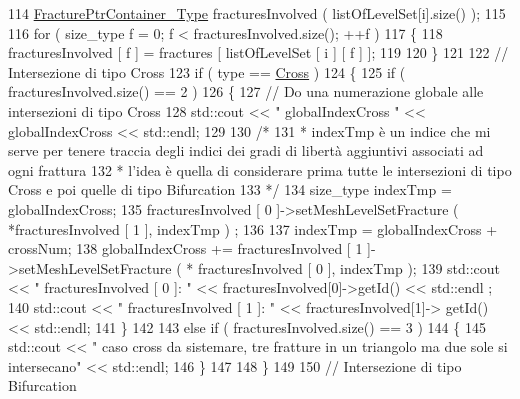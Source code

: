 \begin{DoxyCode}
114            \hyperlink{FractureHandler_8h_a2f0b57e18ecf89912d7de0c87158009e}{FracturePtrContainer\_Type} fracturesInvolved ( listOfLevelSet[i].size() 
      );
115            
116            \textcolor{keywordflow}{for} ( size\_type f = 0; f < fracturesInvolved.size(); ++f )
117            \{
118                 fracturesInvolved [ f ] = fractures [ listOfLevelSet [ i ] [ f ] ];
119                 
120            \}
121 
122            \textcolor{comment}{// Intersezione di tipo Cross}
123            \textcolor{keywordflow}{if} ( type == \hyperlink{classFractureIntersect_a9a4e4a784fa4c8e359767ed543f89dc5a743fef1af81c0e61412fafb9438b380e}{Cross} )
124            \{
125                \textcolor{keywordflow}{if} ( fracturesInvolved.size() == 2 )
126                 \{
127                     \textcolor{comment}{// Do una numerazione globale alle intersezioni di tipo Cross}
128                     std::cout << \textcolor{stringliteral}{" globalIndexCross "} << globalIndexCross << std::endl;
129 
130                     \textcolor{comment}{/*}
131 \textcolor{comment}{                     * indexTmp è un indice che mi serve per tenere traccia degli indici dei gradi di
       libertà aggiuntivi associati ad ogni frattura}
132 \textcolor{comment}{                     * l'idea è quella di considerare prima tutte le intersezioni di tipo Cross e poi
       quelle di tipo Bifurcation }
133 \textcolor{comment}{                     */}
134                     size\_type indexTmp = globalIndexCross;
135                     fracturesInvolved [ 0 ]->setMeshLevelSetFracture ( *fracturesInvolved [ 1 ], indexTmp )
      ;
136                     
137                     indexTmp = globalIndexCross + crossNum;
138                     globalIndexCross += fracturesInvolved [ 1 ]->setMeshLevelSetFracture ( *
      fracturesInvolved [ 0 ], indexTmp );
139                     std::cout << \textcolor{stringliteral}{" fracturesInvolved [ 0 ]: "} << fracturesInvolved[0]->getId() << std::endl
      ;
140                                         std::cout << \textcolor{stringliteral}{" fracturesInvolved [ 1 ]: "} << fracturesInvolved[1]->
      getId() << std::endl;
141                 \}
142 
143                \textcolor{keywordflow}{else} \textcolor{keywordflow}{if} ( fracturesInvolved.size() == 3 )
144                \{
145                    std::cout << \textcolor{stringliteral}{" caso cross da sistemare, tre fratture in un triangolo ma due sole si
       intersecano"} << std::endl;
146                \}
147                
148            \}
149            
150            \textcolor{comment}{// Intersezione di tipo Bifurcation}

\end{DoxyCode}
